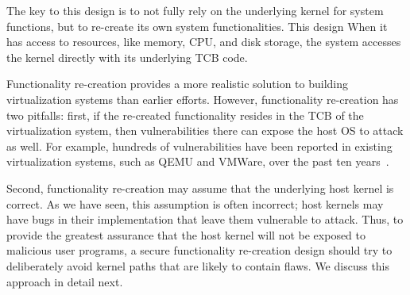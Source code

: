 
The key to this design is to not fully rely on the underlying
kernel for system functions, but to re-create its own system functionalities.
This design  %
When it has access to resources, like memory, CPU, and disk storage, the system
accesses the kernel directly with its underlying TCB code.

Functionality re-creation provides a more realistic solution to building
virtualization systems than earlier efforts.
However, functionality re-creation has two pitfalls:
first, if the re-created functionality resides in the TCB of the virtualization system, then vulnerabilities there can expose the host OS to attack as well.
For example, hundreds of vulnerabilities have been
reported in existing virtualization systems, such as QEMU and VMWare, over the
past ten years~\cite{NVD}.

Second, functionality re-creation may assume that the underlying host kernel is correct.
As we have seen, this assumption is often incorrect; host kernels may have bugs in their implementation that leave them vulnerable to attack.
Thus, to provide the greatest assurance that the host kernel will not be exposed to malicious user programs,
a secure functionality re-creation design should try to deliberately avoid kernel paths that are likely to contain flaws.
We discuss this approach in detail next.

